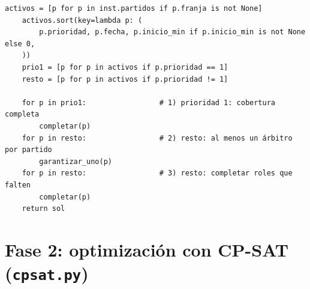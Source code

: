 \documentclass[11pt,a4paper,spanish]{book}
\numberwithin{equation}{chapter}
\numberwithin{figure}{chapter}
\numberwithin{table}{chapter}
\begin{document}
\begin{lstlisting}[caption={\texttt{greedy.py} --- construcción golosa de la solución inicial.}]
    activos = [p for p in inst.partidos if p.franja is not None]
    activos.sort(key=lambda p: (
        p.prioridad, p.fecha, p.inicio_min if p.inicio_min is not None else 0,
    ))
    prio1 = [p for p in activos if p.prioridad == 1]
    resto = [p for p in activos if p.prioridad != 1]

    for p in prio1:                 # 1) prioridad 1: cobertura completa
        completar(p)
    for p in resto:                 # 2) resto: al menos un árbitro por partido
        garantizar_uno(p)
    for p in resto:                 # 3) resto: completar roles que falten
        completar(p)
    return sol
\end{lstlisting}

\section{Fase 2: optimización con CP-SAT (\texttt{cpsat.py})}
\end{document}
